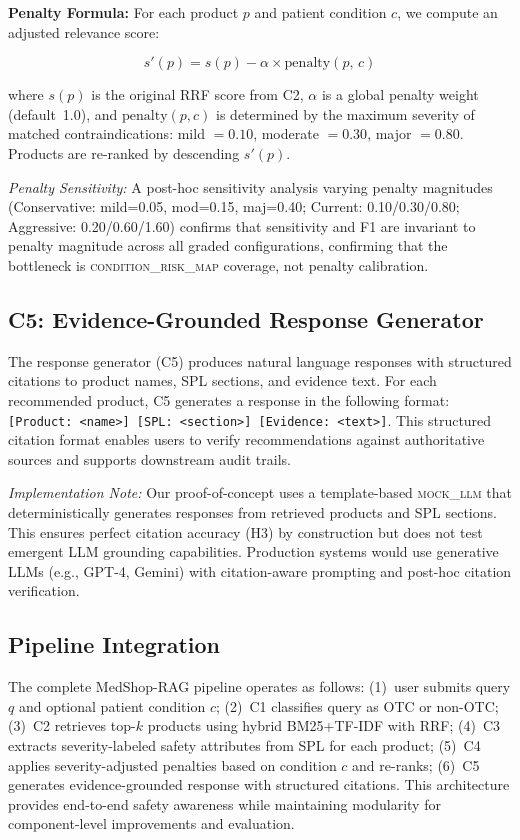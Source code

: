 \documentclass[conference]{IEEEtran}
\begin{document}
\textbf{Penalty Formula:} For each product $p$ and patient condition $c$, we
compute an adjusted relevance score:

\begin{equation}
  s'(p) = s(p) - \alpha \times \mathrm{penalty}(p,\, c)
  \label{eq:penalty}
\end{equation}

\noindent where $s(p)$ is the original RRF score from C2, $\alpha$ is a global
penalty weight (default~1.0), and $\mathrm{penalty}(p,c)$ is determined by the
maximum severity of matched contraindications: mild $= 0.10$, moderate $= 0.30$,
major $= 0.80$. Products are re-ranked by descending $s'(p)$.

\textit{Penalty Sensitivity:} A post-hoc sensitivity analysis varying penalty
magnitudes (Conservative: mild=0.05, mod=0.15, maj=0.40; Current: 0.10/0.30/0.80;
Aggressive: 0.20/0.60/1.60) confirms that sensitivity and F1 are invariant to
penalty magnitude across all graded configurations, confirming that the
bottleneck is \textsc{condition\_risk\_map} coverage, not penalty calibration.

\subsection{C5: Evidence-Grounded Response Generator}

The response generator (C5) produces natural language responses with structured
citations to product names, SPL sections, and evidence text. For each
recommended product, C5 generates a response in the following format:
\texttt{[Product: <name>] [SPL: <section>] [Evidence: <text>]}. This structured
citation format enables users to verify recommendations against authoritative
sources and supports downstream audit trails.

\textit{Implementation Note:} Our proof-of-concept uses a template-based
\textsc{mock\_llm} that deterministically generates responses from retrieved
products and SPL sections. This ensures perfect citation accuracy (H3) by
construction but does not test emergent LLM grounding capabilities. Production
systems would use generative LLMs (e.g., GPT-4, Gemini) with citation-aware
prompting and post-hoc citation verification.

\subsection{Pipeline Integration}

The complete MedShop-RAG pipeline operates as follows: (1)~user submits query
$q$ and optional patient condition $c$; (2)~C1 classifies query as OTC or
non-OTC; (3)~C2 retrieves top-$k$ products using hybrid BM25+TF-IDF with RRF;
(4)~C3 extracts severity-labeled safety attributes from SPL for each product;
(5)~C4 applies severity-adjusted penalties based on condition $c$ and re-ranks;
(6)~C5 generates evidence-grounded response with structured citations.
This architecture provides end-to-end safety awareness while maintaining
modularity for component-level improvements and evaluation.
\end{document}
